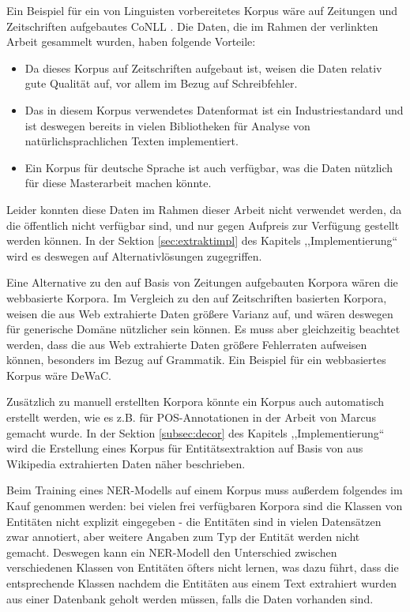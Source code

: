 Ein Beispiel für ein von Linguisten vorbereitetes Korpus wäre auf Zeitungen und Zeitschriften aufgebautes CoNLL \cite{tjong2003introduction}. Die Daten, die im Rahmen der verlinkten Arbeit gesammelt wurden, haben folgende Vorteile:
\begin{itemize}
\item Da dieses Korpus auf Zeitschriften aufgebaut ist, weisen die Daten relativ gute Qualität auf, vor allem im Bezug auf Schreibfehler.
\item Das in diesem Korpus verwendetes Datenformat ist ein Industriestandard und ist deswegen bereits in vielen Bibliotheken für Analyse von natürlichsprachlichen Texten implementiert. 
\item Ein Korpus für deutsche Sprache ist auch verfügbar, was die Daten nützlich für diese Masterarbeit machen könnte.
\end{itemize}
Leider konnten diese Daten im Rahmen dieser Arbeit nicht verwendet werden, da die öffentlich nicht verfügbar sind, und nur gegen Aufpreis zur Verfügung gestellt werden können. In der Sektion \ref{sec:extraktimpl} des Kapitels ,,Implementierung`` wird es deswegen auf Alternativlösungen zugegriffen.

Eine Alternative zu den auf Basis von Zeitungen aufgebauten Korpora wären die webbasierte Korpora\cite{liu2006web}. Im Vergleich zu den auf Zeitschriften basierten Korpora, weisen die aus Web extrahierte Daten größere Varianz auf, und wären deswegen für generische Domäne nützlicher sein können. Es muss aber gleichzeitig beachtet werden, dass die aus Web extrahierte Daten größere Fehlerraten aufweisen können, besonders im Bezug auf Grammatik. Ein Beispiel für ein webbasiertes Korpus wäre DeWaC\cite{baroni2009wacky}.

Zusätzlich zu manuell erstellten Korpora könnte ein Korpus auch automatisch erstellt werden, wie es z.B. für POS-Annotationen in der Arbeit von Marcus\cite{marcus1993building} gemacht wurde. In der Sektion \ref{subsec:decor} des Kapitels ,,Implementierung`` wird die Erstellung eines Korpus für Entitätsextraktion auf Basis von aus Wikipedia extrahierten Daten näher beschrieben.

Beim Training eines NER-Modells auf einem Korpus muss außerdem folgendes im Kauf genommen werden: bei vielen frei verfügbaren Korpora sind die Klassen von Entitäten nicht explizit eingegeben - die Entitäten sind in vielen Datensätzen zwar annotiert, aber weitere Angaben zum Typ der Entität werden nicht gemacht. Deswegen kann ein NER-Modell den Unterschied zwischen verschiedenen Klassen von Entitäten öfters nicht lernen, was dazu führt, dass die entsprechende Klassen nachdem die Entitäten aus einem Text extrahiert wurden aus einer Datenbank geholt werden müssen, falls die Daten vorhanden sind.


